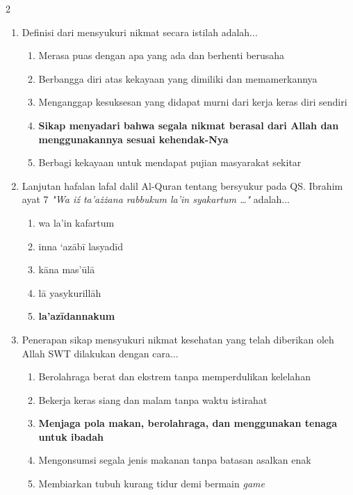 \documentclass[10pt,a4paper]{article}
\begin{document}
\begin{multicols}{2}
\begin{enumerate}
    \item Definisi dari mensyukuri nikmat secara istilah adalah...
    \begin{enumerate}
      \item Merasa puas dengan apa yang ada dan berhenti berusaha
      \item Berbangga diri atas kekayaan yang dimiliki dan memamerkannya
      \item Menganggap kesuksesan yang didapat murni dari kerja keras diri sendiri
      \item \textbf{Sikap menyadari bahwa segala nikmat berasal dari Allah dan menggunakannya sesuai kehendak-Nya}
      \item Berbagi kekayaan untuk mendapat pujian masyarakat sekitar
    \end{enumerate}

    \item Lanjutan hafalan lafal dalil Al-Quran tentang bersyukur pada QS. Ibrahim ayat 7 \textit{"Wa iź ta’ażżana rabbukum la’in syakartum \dots"} adalah...
    \begin{enumerate}
      \item wa la’in kafartum
      \item inna ‘azābī lasyadīd
      \item kāna mas’ūlā
      \item lā yasykurillāh
      \item \textbf{la’azīdannakum}
    \end{enumerate}

    \item Penerapan sikap mensyukuri nikmat kesehatan yang telah diberikan oleh Allah SWT dilakukan dengan cara...
    \begin{enumerate}
      \item Berolahraga berat dan ekstrem tanpa memperdulikan kelelahan
      \item Bekerja keras siang dan malam tanpa waktu istirahat
      \item \textbf{Menjaga pola makan, berolahraga, dan menggunakan tenaga untuk ibadah}
      \item Mengonsumsi segala jenis makanan tanpa batasan asalkan enak
      \item Membiarkan tubuh kurang tidur demi bermain \textit{game}
    \end{enumerate}


\end{enumerate}
\end{multicols}
\end{document}
